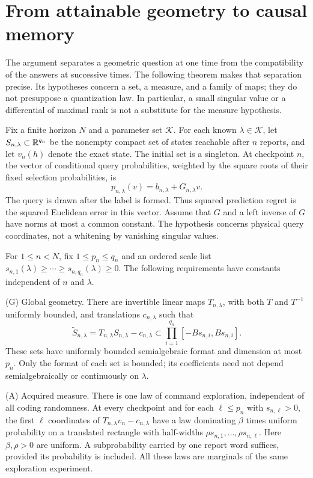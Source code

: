 \section{From attainable geometry to causal memory}
\label{sec:causal-transfer}
The argument separates a geometric question at one time from the
compatibility of the answers at successive times. The following theorem
makes that separation precise. Its hypotheses concern a set, a measure,
and a family of maps; they do not presuppose a quantization law. In
particular, a small singular value or a differential of maximal rank is
not a substitute for the measure hypothesis.

Fix a finite horizon $N$ and a parameter set $\mathcal K$. For each
known $\lambda\in\mathcal K$, let $S_{n,\lambda}\subset\mathbb R^{q_n}$ be
the nonempty compact set of states reachable after $n$ reports, and let
$v_n(h)$ denote the exact state. The initial set is a singleton. At
checkpoint $n$, the vector of conditional query probabilities, weighted
by the square roots of their fixed selection probabilities, is
\[
 p_{n,\lambda}(v)=b_{n,\lambda}+G_{n,\lambda}v.
\]
The query is drawn after the label is formed. Thus squared prediction
regret is the squared Euclidean error in this vector. Assume that $G$
and a left inverse of $G$ have norms at most a common constant. The
hypothesis concerns physical query coordinates, not a whitening by
vanishing singular values.

For $1\le n<N$, fix $1\le p_n\le q_n$ and an ordered scale list
$s_{n,1}(\lambda)\ge\cdots\ge s_{n,q_n}(\lambda)\ge0$. The
following requirements have constants independent of $n$ and $\lambda$.

\smallskip\noindent\textup{(G) Global geometry.}
There are invertible linear maps $T_{n,\lambda}$, with both $T$ and
$T^{-1}$ uniformly bounded, and translations $c_{n,\lambda}$ such that
\[
 \widetilde S_{n,\lambda}=T_{n,\lambda}S_{n,\lambda}-c_{n,\lambda}
 \subset\prod_{i=1}^{q_n}[-B s_{n,i},B s_{n,i}].
\]
These sets have uniformly bounded semialgebraic format and dimension
at most $p_n$. Only the format of each set is bounded; its coefficients
need not depend semialgebraically or continuously on $\lambda$.

\smallskip\noindent\textup{(A) Acquired measure.}
There is one law of command exploration, independent of all coding
randomness. At every checkpoint and for each $\ell\le p_n$ with
$s_{n,\ell}>0$, the first $\ell$ coordinates of
$T_{n,\lambda}v_n-c_{n,\lambda}$ have a law dominating $\beta$
times uniform probability on a translated rectangle with half-widths
$\rho s_{n,1},\ldots,\rho s_{n,\ell}$. Here $\beta,\rho>0$ are
uniform. A subprobability carried by one report word suffices, provided
its probability is included. All these laws are marginals of the same
exploration experiment.

